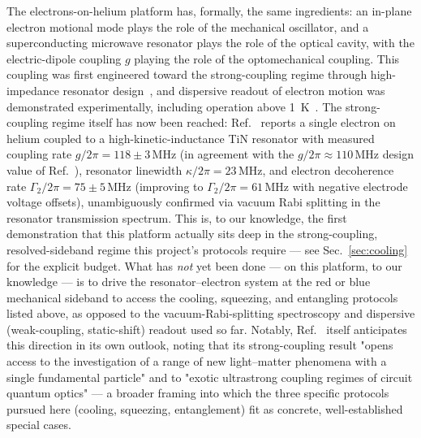 \documentclass[aps,prapplied,reprint,superscriptaddress,longbibliography]{revtex4-2}
\begin{document}
The electrons-on-helium platform has, formally, the same ingredients: an in-plane electron motional
mode plays the role of the mechanical oscillator, and a superconducting microwave resonator plays
the role of the optical cavity, with the electric-dipole coupling $g$ playing the role of the
optomechanical coupling. This coupling was first engineered toward the strong-coupling regime through
high-impedance resonator design~\cite{koolstra2025impedance}, and dispersive readout of electron
motion was demonstrated experimentally, including operation above 1~K~\cite{castoria2025}. The
strong-coupling regime itself has now been reached: Ref.~\cite{koolstra2026strong} reports a single
electron on helium coupled to a high-kinetic-inductance TiN resonator with measured coupling rate
$g/2\pi = 118\pm3\,\mathrm{MHz}$ (in agreement with the $g/2\pi\approx110\,\mathrm{MHz}$ design value
of Ref.~\cite{koolstra2025impedance}), resonator linewidth $\kappa/2\pi = 23\,\mathrm{MHz}$, and
electron decoherence rate $\Gamma_2/2\pi = 75\pm5\,\mathrm{MHz}$ (improving to
$\Gamma_2/2\pi = 61\,\mathrm{MHz}$ with negative electrode voltage offsets), unambiguously confirmed
via vacuum Rabi splitting in the resonator transmission spectrum. This is, to our knowledge, the
first demonstration that this platform actually sits deep in the strong-coupling, resolved-sideband
regime this project's protocols require — see Sec.~\ref{sec:cooling} for the explicit budget. What
has \emph{not} yet been done — on this platform, to our knowledge — is to drive the
resonator--electron system at the red or blue mechanical sideband to access the cooling, squeezing,
and entangling protocols listed above, as opposed to the vacuum-Rabi-splitting spectroscopy and
dispersive (weak-coupling, static-shift) readout used so far. Notably, Ref.~\cite{koolstra2026strong}
itself anticipates this direction in its own outlook, noting that its strong-coupling result "opens
access to the investigation of a range of new light–matter phenomena with a single fundamental
particle" and to "exotic ultrastrong coupling regimes of circuit quantum optics" — a broader framing
into which the three specific protocols pursued here (cooling, squeezing, entanglement) fit as
concrete, well-established special cases.
\end{document}
